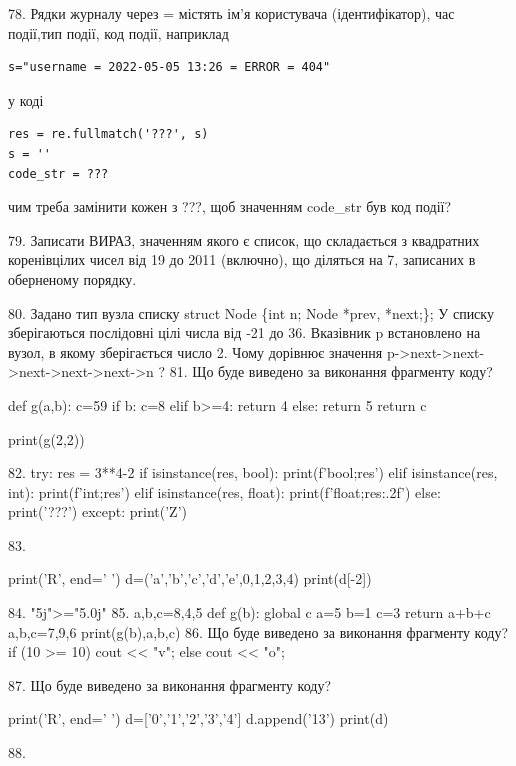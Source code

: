 \documentclass[11pt]{article}
\begin{document}
{%
78. 
Рядки журналу через = містять ім'я користувача (ідентифікатор), час події,тип події, код події, наприклад
\begin{verbatim}
s="username = 2022-05-05 13:26 = ERROR = 404"
\end{verbatim}
у коді 
\begin{verbatim}
res = re.fullmatch('???', s) 
s = ''
code_str = ??? 
\end{verbatim}
чим треба замінити кожен з ???, щоб значенням code\_str був код події? 



79. 
Записати ВИРАЗ, значенням якого є список, що складається з квадратних коренівцілих чисел від 19 до 2011 (включно), що діляться на 7, записаних в обернено\-му порядку.

80. 
Задано тип вузла списку
struct Node \{int n; Node *prev, *next;\};
У списку зберігаються послідовні цілі числа від -21 до 36. Вказівник p встановлено на вузол, в якому зберігається число 2.
Чому дорівнює значення p->next->next->next->next->next->n ?
81. Що буде виведено за виконання фрагменту коду?

def g(a,b):
    c=59
    if b:
        c=8
    elif b>=4:
         return 4
    else: 
        return 5
    return c

print(g(2,2))

82. 
try:
    res = 3**4-2
    if isinstance(res, bool):
        print(f'bool;{res}')
    elif isinstance(res, int):
        print(f'int;{res}')
    elif isinstance(res, float):
        print(f'float;{res:.2f}')
    else:
        print('???')
except:
    print('Z')

83. 

print('R', end=' ')
d=('a','b','c','d','e',0,1,2,3,4)
print(d[-2])


84. 
"5j">="5.0j"
85. 
a,b,c=8,4,5
    def g(b):
      global c      a=5
      b=1
      c=3
      return a+b+c
    a,b,c=7,9,6
    print(g(b),a,b,c)
86. Що буде виведено за виконання фрагменту коду?
if (10 >= 10)
    cout << "v";
else
    cout << "o";


87. Що буде виведено за виконання фрагменту коду?

print('R', end=' ')
d=['0','1','2','3','4']
d.append('13')
print(d)


88. 

}
\end{document}
